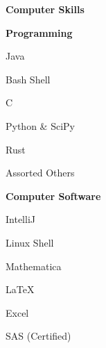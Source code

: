 \documentclass[a4paper,12pt,final]{memoir}
\newcommand{\Sep}{\vspace{1.5em}}
\newcommand{\SmallSep}{\vspace{0.5em}}
\newcommand{\CVSection}[1]
	{\Large\textbf{#1}\par
	\SmallSep\normalsize\normalfont}
\newcommand{\CVItem}[1]
	{\textbf{\color{RoyalBlue} #1}}
\begin{document}
\Sep

\CVSection{Computer Skills}
\CVItem{Programming}
\begin{multicols}{3}
	\begin{compactitem}[\color{RoyalBlue}$\circ$]
		\item Java
		\item Bash Shell
		\item C
		\item Python \& SciPy
		\item Rust
		\item Assorted Others
	\end{compactitem}
\end{multicols}
\SmallSep

\CVItem{Computer Software}
\begin{multicols}{3}
	\begin{compactitem}[\color{RoyalBlue}$\circ$]
		\item IntelliJ
		\item Linux Shell
		\item Mathematica
		\item LaTeX
		\item Excel
		\item SAS (Certified)
	\end{compactitem}
\end{multicols}



\end{document}
